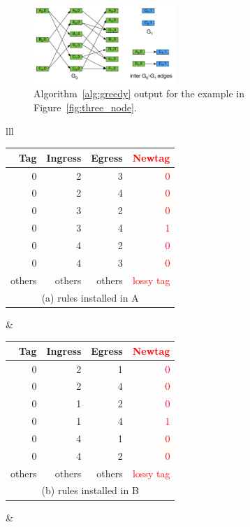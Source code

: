 \begin{figure}[t]
	\centering
	\includegraphics[width=0.48\textwidth] {figs/alo_walkthrough_c}
	\caption{Algorithm~\ref{alg:greedy} output for the example in Figure~\ref{fig:three_node}.}
	\label{fig:greedy}
\end{figure}

\begin{table}[t]
	\footnotesize
	\centering
	\begin{tabular}{lll}
		\begin{tabular}{|r|r|r|r|}
			\hline
			Tag&  Ingress& Egress & \textcolor{red}{Newtag} \\
			\hline
			\hline
			0 & 2 & 3 & \textcolor{red}{0} \\
			\hline
			0 & 2 & 4 & \textcolor{red}{0} \\
			\hline
			0 & 3 & 2 & \textcolor{red}{0} \\
			\hline
			0 & 3 & 4 & \textcolor{red}{1} \\
			\hline
			0 & 4 & 2 & \textcolor{red}{0} \\
			\hline
			0 & 4 & 3 & \textcolor{red}{0} \\
			\hline
			others & others & others & \textcolor{red}{lossy tag} \\
			\hline
			\multicolumn{4}{c}{(a) rules installed in A} \\
		\end{tabular}
		&
		\begin{tabular}{|r|r|r|r|}
			\hline
			Tag&  Ingress& Egress & \textcolor{red}{Newtag} \\
			\hline
			\hline
			0 & 2 & 1 & \textcolor{red}{0} \\
			\hline
			0 & 2 & 4 & \textcolor{red}{0} \\
			\hline
			0 & 1 & 2 & \textcolor{red}{0} \\
			\hline
			0 & 1 & 4 & \textcolor{red}{1} \\
			\hline
			0 & 4 & 1 & \textcolor{red}{0} \\
			\hline
			0 & 4 & 2 & \textcolor{red}{0} \\
			\hline
			others & others & others & \textcolor{red}{lossy tag} \\
			\hline
			\multicolumn{4}{c}{(b) rules installed in B} \\
		\end{tabular}
		&
		

\end{tabular}
\end{table}
